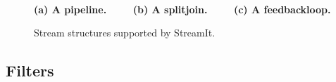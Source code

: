 \begin{figure}[t]
\vspace{-6pt}
~~
\begin{minipage}{0.46in}
\centering
{} \\
\end{minipage} 
~
\begin{minipage}{1.3in}
\centering
{} \\
\end{minipage}
~
\begin{minipage}{1.02in}
\centering
{} \\
\end{minipage} 
\\ ~ \\ {\bf \protect\small (a) A pipeline. ~~~~(b) A splitjoin. ~~~~(c) A feedbackloop.}
\caption{Stream structures supported by StreamIt.}
\label{fig:structuresp}
\vspace{-14pt}
\vspace{-6pt}
\makeline
\end{figure}


\subsection{Filters}

